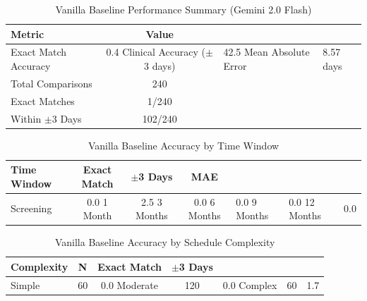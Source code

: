 
\begin{table}[htbp]
\centering
\caption{Vanilla Baseline Performance Summary (Gemini 2.0 Flash)}
\label{tab:vanilla_baseline_summary}
\begin{tabular}{lc}
\toprule
\textbf{Metric} & \textbf{Value} \\
\midrule
Exact Match Accuracy & 0.4%
Clinical Accuracy ($\pm$3 days) & 42.5%
Mean Absolute Error & 8.57 days \\
Total Comparisons & 240 \\
Exact Matches & 1/240 \\
Within $\pm$3 Days & 102/240 \\
\bottomrule
\end{tabular}
\end{table}

\begin{table}[htbp]
\centering
\caption{Vanilla Baseline Accuracy by Time Window}
\label{tab:vanilla_baseline_windows}
\begin{tabular}{lccc}
\toprule
\textbf{Time Window} & \textbf{Exact Match} & \textbf{$\pm$3 Days} & \textbf{MAE} \\
\midrule
Screening & 0.0%
1 Month & 2.5%
3 Months & 0.0%
6 Months & 0.0%
9 Months & 0.0%
12 Months & 0.0%
\bottomrule
\end{tabular}
\end{table}

\begin{table}[htbp]
\centering
\caption{Vanilla Baseline Accuracy by Schedule Complexity}
\label{tab:vanilla_baseline_complexity}
\begin{tabular}{lccc}
\toprule
\textbf{Complexity} & \textbf{N} & \textbf{Exact Match} & \textbf{$\pm$3 Days} \\
\midrule
Simple & 60 & 0.0%
Moderate & 120 & 0.0%
Complex & 60 & 1.7%
\bottomrule
\end{tabular}
\end{table}

